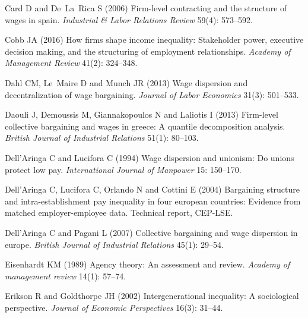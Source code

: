 \documentclass[12pt]{article}
\begin{document}
\begin{thebibliography}{38}
Card D and De~La~Rica S (2006) Firm-level contracting and the structure of
  wages in spain.
\newblock \emph{Industrial \& Labor Relations Review} 59(4): 573--592.

Cobb JA (2016) How firms shape income inequality: Stakeholder power, executive
  decision making, and the structuring of employment relationships.
\newblock \emph{Academy of Management Review} 41(2): 324--348.

Dahl CM, Le~Maire D and Munch JR (2013) Wage dispersion and decentralization of
  wage bargaining.
\newblock \emph{Journal of Labor Economics} 31(3): 501--533.

Daouli J, Demoussis M, Giannakopoulos N and Laliotis I (2013) Firm-level
  collective bargaining and wages in greece: A quantile decomposition analysis.
\newblock \emph{British Journal of Industrial Relations} 51(1): 80--103.

{Dell'Aringa} C and Lucifora C (1994) Wage dispersion and unionism: Do unions
  protect low pay.
\newblock \emph{International Journal of Manpower} 15: 150--170.

{Dell'Aringa} C, Lucifora C, Orlando N and Cottini E (2004) Bargaining
  structure and intra-establishment pay inequality in four european countries:
  Evidence from matched employer-employee data.
\newblock Technical report, CEP-LSE.

{Dell'Aringa} C and Pagani L (2007) Collective bargaining and wage dispersion
  in europe.
\newblock \emph{British Journal of Industrial Relations} 45(1): 29--54.

Eisenhardt KM (1989) Agency theory: An assessment and review.
\newblock \emph{Academy of management review} 14(1): 57--74.

Erikson R and Goldthorpe JH (2002) Intergenerational inequality: A sociological
  perspective.
\newblock \emph{Journal of Economic Perspectives} 16(3): 31--44.


\end{thebibliography}
\end{document}
